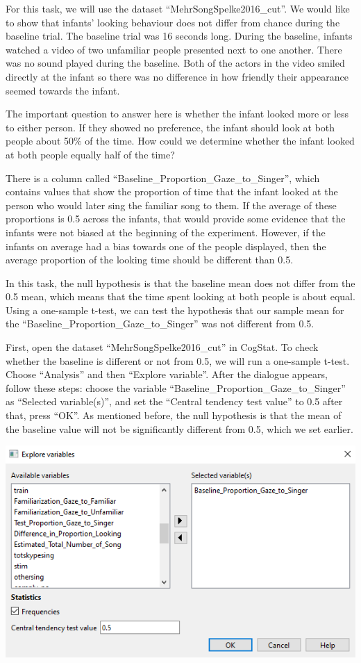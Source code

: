 \documentclass[
]{book}
\begin{document}
For this task, we will use the dataset ``MehrSongSpelke2016\_cut''. We would like to show that infants' looking behaviour does not differ from chance during the baseline trial. The baseline trial was 16 seconds long. During the baseline, infants watched a video of two unfamiliar people presented next to one another. There was no sound played during the baseline. Both of the actors in the video smiled directly at the infant so there was no difference in how friendly their appearance seemed towards the infant.

The important question to answer here is whether the infant looked more or less to either person. If they showed no preference, the infant should look at both people about 50\% of the time. How could we determine whether the infant looked at both people equally half of the time?

There is a column called ``Baseline\_Proportion\_Gaze\_to\_Singer'', which contains values that show the proportion of time that the infant looked at the person who would later sing the familiar song to them. If the average of these proportions is 0.5 across the infants, that would provide some evidence that the infants were not biased at the beginning of the experiment. However, if the infants on average had a bias towards one of the people displayed, then the average proportion of the looking time should be different than 0.5.

In this task, the null hypothesis is that the baseline mean does not differ from the 0.5 mean, which means that the time spent looking at both people is about equal. Using a one-sample t-test, we can test the hypothesis that our sample mean for the ``Baseline\_Proportion\_Gaze\_to\_Singer'' was not different from 0.5.

First, open the dataset ``MehrSongSpelke2016\_cut'' in CogStat. To check whether the baseline is different or not from 0.5, we will run a one-sample t-test. Choose ``Analysis'' and then ``Explore variable''. After the dialogue appears, follow these steps: choose the variable ``Baseline\_Proportion\_Gaze\_to\_Singer'' as ``Selected variable(s)'', and set the ``Central tendency test value'' to 0.5 after that, press ``OK''. As mentioned before, the null hypothesis is that the mean of the baseline value will not be significantly different from 0.5, which we set earlier.

\includegraphics{img/ch6/6.4expvarwindow.png}
\end{document}
